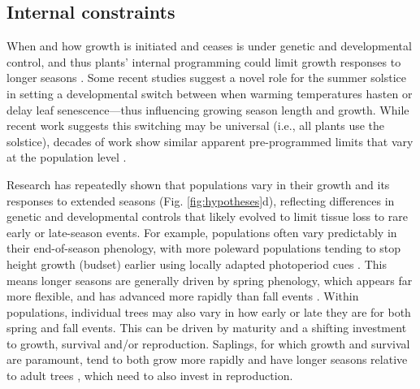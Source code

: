 \documentclass[11pt]{article}
\begin{document}
\subsection*{Internal constraints}
When and how growth is initiated and ceases is under genetic and developmental control, and thus plants' internal programming could limit growth responses to longer seasons \citep{marchand2021timing,mckown2016impacts,soolanayakanahally2013timing}. Some recent studies suggest a novel role for the summer solstice \citep{zohner2023effect} in setting a developmental switch between when warming temperatures hasten or delay leaf senescence---thus influencing growing season length and growth. While recent work suggests this switching may be universal (i.e., all plants use the solstice), decades of work show similar apparent pre-programmed limits that vary at the population level \citep{aitken2016}. 

Research has repeatedly shown that populations vary in their growth and its responses to extended seasons (Fig. \ref{fig:hypotheses}d), reflecting differences in genetic and developmental controls that likely evolved to limit tissue loss to rare early or late-season events. For example, populations often vary predictably in their end-of-season phenology, with more poleward populations tending to stop height growth (budset) earlier using locally adapted photoperiod cues \citep{soolanayakanahally2013timing,aitken2016}. This means longer seasons are generally driven by spring phenology, which appears far more flexible, and has advanced more rapidly than fall events \citep{aitken2016}. Within populations, individual trees may also vary in how early or late they are for both spring and fall events. This can be driven by maturity and a shifting investment to growth, survival and/or reproduction. Saplings, for which growth and survival are paramount, tend to both grow more rapidly \citep{hilty2021plant} and have longer seasons relative to adult trees \citep{augspurger2003differences,rozendaal2010tropical,vitasse2014earlier}, which need to also invest in reproduction. %
\end{document}
